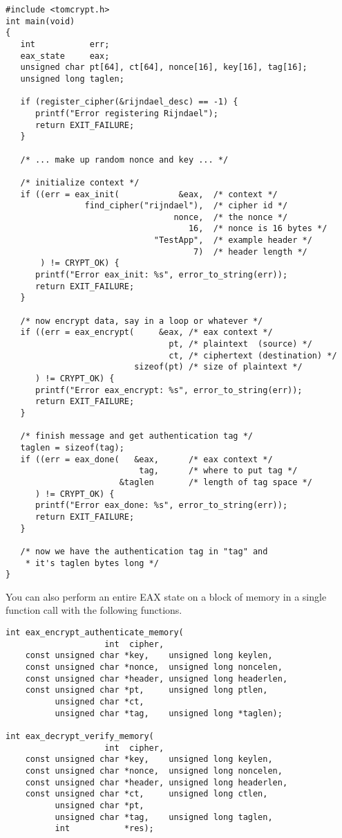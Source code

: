 \documentclass[synpaper]{book}
\begin{document}
\begin{verbatim}
#include <tomcrypt.h>
int main(void)
{
   int           err;
   eax_state     eax;
   unsigned char pt[64], ct[64], nonce[16], key[16], tag[16];
   unsigned long taglen;

   if (register_cipher(&rijndael_desc) == -1) {
      printf("Error registering Rijndael");
      return EXIT_FAILURE;
   }

   /* ... make up random nonce and key ... */

   /* initialize context */
   if ((err = eax_init(            &eax,  /* context */
                find_cipher("rijndael"),  /* cipher id */
                                  nonce,  /* the nonce */
                                     16,  /* nonce is 16 bytes */
                              "TestApp",  /* example header */
                                      7)  /* header length */
       ) != CRYPT_OK) {
      printf("Error eax_init: %s", error_to_string(err));
      return EXIT_FAILURE;
   }

   /* now encrypt data, say in a loop or whatever */
   if ((err = eax_encrypt(     &eax, /* eax context */
                                 pt, /* plaintext  (source) */
                                 ct, /* ciphertext (destination) */
                          sizeof(pt) /* size of plaintext */
      ) != CRYPT_OK) {
      printf("Error eax_encrypt: %s", error_to_string(err));
      return EXIT_FAILURE;
   }

   /* finish message and get authentication tag */
   taglen = sizeof(tag);
   if ((err = eax_done(   &eax,      /* eax context */
                           tag,      /* where to put tag */
                       &taglen       /* length of tag space */
      ) != CRYPT_OK) {
      printf("Error eax_done: %s", error_to_string(err));
      return EXIT_FAILURE;
   }

   /* now we have the authentication tag in "tag" and
    * it's taglen bytes long */
}
\end{verbatim}

You can also perform an entire EAX state on a block of memory in a single function call with the
following functions.


 
\begin{verbatim}
int eax_encrypt_authenticate_memory(
                    int  cipher,
    const unsigned char *key,    unsigned long keylen,
    const unsigned char *nonce,  unsigned long noncelen,
    const unsigned char *header, unsigned long headerlen,
    const unsigned char *pt,     unsigned long ptlen,
          unsigned char *ct,
          unsigned char *tag,    unsigned long *taglen);

int eax_decrypt_verify_memory(
                    int  cipher,
    const unsigned char *key,    unsigned long keylen,
    const unsigned char *nonce,  unsigned long noncelen,
    const unsigned char *header, unsigned long headerlen,
    const unsigned char *ct,     unsigned long ctlen,
          unsigned char *pt,
          unsigned char *tag,    unsigned long taglen,
          int           *res);
\end{verbatim}
\end{document}
